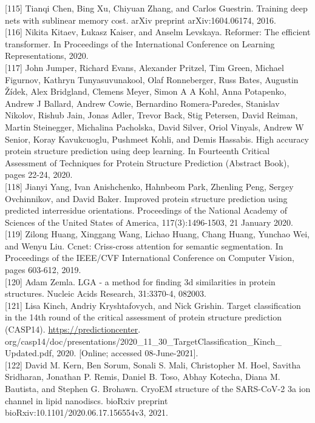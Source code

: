 \documentclass[10pt]{article}
\begin{document}
[115] Tianqi Chen, Bing Xu, Chiyuan Zhang, and Carlos Guestrin. Training deep nets with sublinear memory cost. arXiv preprint arXiv:1604.06174, 2016.\\[0pt]
[116] Nikita Kitaev, Łukasz Kaiser, and Anselm Levskaya. Reformer: The efficient transformer. In Proceedings of the International Conference on Learning Representations, 2020.\\[0pt]
[117] John Jumper, Richard Evans, Alexander Pritzel, Tim Green, Michael Figurnov, Kathryn Tunyasuvunakool, Olaf Ronneberger, Russ Bates, Augustin Žídek, Alex Bridgland, Clemens Meyer, Simon A A Kohl, Anna Potapenko, Andrew J Ballard, Andrew Cowie, Bernardino Romera-Paredes, Stanislav Nikolov, Rishub Jain, Jonas Adler, Trevor Back, Stig Petersen, David Reiman, Martin Steinegger, Michalina Pacholska, David Silver, Oriol Vinyals, Andrew W Senior, Koray Kavukcuoglu, Pushmeet Kohli, and Demis Hassabis. High accuracy protein structure prediction using deep learning. In Fourteenth Critical Assessment of Techniques for Protein Structure Prediction (Abstract Book), pages 22-24, 2020.\\[0pt]
[118] Jianyi Yang, Ivan Anishchenko, Hahnbeom Park, Zhenling Peng, Sergey Ovchinnikov, and David Baker. Improved protein structure prediction using predicted interresidue orientations. Proceedings of the National Academy of Sciences of the United States of America, 117(3):1496-1503, 21 January 2020.\\[0pt]
[119] Zilong Huang, Xinggang Wang, Lichao Huang, Chang Huang, Yunchao Wei, and Wenyu Liu. Ccnet: Criss-cross attention for semantic segmentation. In Proceedings of the IEEE/CVF International Conference on Computer Vision, pages 603-612, 2019.\\[0pt]
[120] Adam Zemla. LGA - a method for finding 3d similarities in protein structures. Nucleic Acids Research, 31:3370-4, 082003.\\[0pt]
[121] Lisa Kinch, Andriy Kryshtafovych, and Nick Grishin. Target classification in the 14th round of the critical assessment of protein structure prediction (CASP14). \href{https://predictioncenter}{https://predictioncenter}. org/casp14/doc/presentations/2020\_11\_30\_TargetClassification\_Kinch\_ Updated.pdf, 2020. [Online; accessed 08-June-2021].\\[0pt]
[122] David M. Kern, Ben Sorum, Sonali S. Mali, Christopher M. Hoel, Savitha Sridharan, Jonathan P. Remis, Daniel B. Toso, Abhay Kotecha, Diana M. Bautista, and Stephen G. Brohawn. CryoEM structure of the SARS-CoV-2 3a ion channel in lipid nanodiscs. bioRxiv preprint bioRxiv:10.1101/2020.06.17.156554v3, 2021.\\[0pt]
\end{document}
